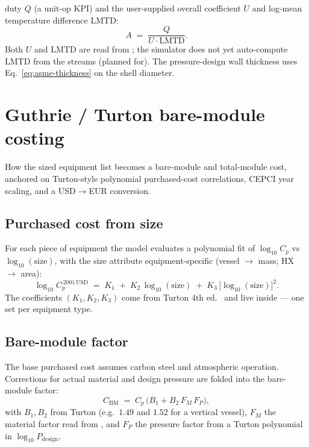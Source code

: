 \documentclass[11pt,a4paper]{article}
\begin{document}
duty $Q$ (a unit-op KPI) and the user-supplied overall coefficient
$U$ and log-mean temperature difference $\mathrm{LMTD}$:
\begin{equation}
   A \;=\; \frac{Q}{U \cdot \mathrm{LMTD}}.
\end{equation}
Both $U$ and $\mathrm{LMTD}$ are read from
; the simulator does not yet auto-compute LMTD
from the streams (planned for). The pressure-design wall
thickness uses Eq.~\eqref{eq:asme-thickness} on the shell diameter.

\section{Guthrie / Turton bare-module costing}\label{ch:cost-guthrie}

\begin{whatyoulllearn}
How the sized equipment list becomes a bare-module and total-module
cost, anchored on Turton-style polynomial purchased-cost
correlations, CEPCI year scaling, and a USD$\to$EUR conversion.
\end{whatyoulllearn}

\subsection{Purchased cost from size}

For each piece of equipment the model evaluates a polynomial fit of
$\log_{10} C_p$ vs $\log_{10}\!(\mathrm{size})$, with the size
attribute equipment-specific (vessel $\to$ mass; HX $\to$ area):
\begin{equation}
   \log_{10} C_p^{\,2001\,\mathrm{USD}}
   \;=\; K_1 \;+\; K_2\,\log_{10}(\text{size})
       \;+\; K_3\,\bigl[\log_{10}(\text{size})\bigr]^2.
\end{equation}
The coefficients $(K_1, K_2, K_3)$ come from Turton 4th ed.\
\cite{Turton} and live inside 
--- one set per equipment type.

\subsection{Bare-module factor}

The base purchased cost assumes carbon steel and atmospheric
operation. Corrections for actual material and design pressure are
folded into the bare-module factor:
\begin{equation}
   C_{\mathrm{BM}}
   \;=\; C_p \, \bigl(B_1 + B_2 \, F_M \, F_P\bigr),
   \label{eq:bare-module}
\end{equation}
with $B_1, B_2$ from Turton (e.g.\ $1.49$ and $1.52$ for a vertical
vessel), $F_M$ the material factor read from
, and $F_P$ the pressure
factor from a Turton polynomial in $\log_{10} P_{\mathrm{design}}$.
\end{document}
